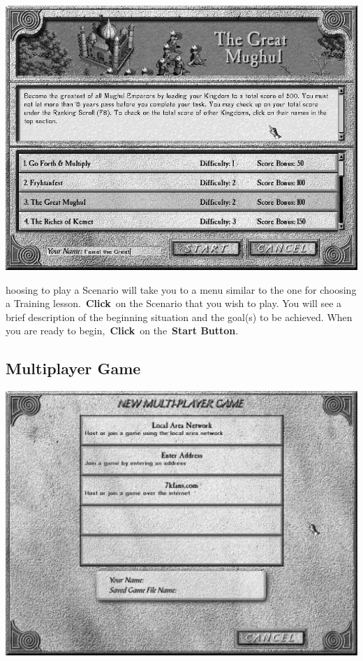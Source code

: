 \begin{center}
	\includegraphics[width=0.9\linewidth]{Iscenario}
\end{center}

hoosing to play a Scenario will take you to a menu similar to the one for choosing a Training lesson. \textbf{Click} on the Scenario that you wish to play. You will see a brief description of the beginning situation and the goal(s) to be achieved. When you are ready to begin, \textbf{Click} on the \textbf{Start Button}.

\subsection{Multiplayer Game}


\begin{center}
	\includegraphics[width=0.9\linewidth]{Imultiplayer}
\end{center}

